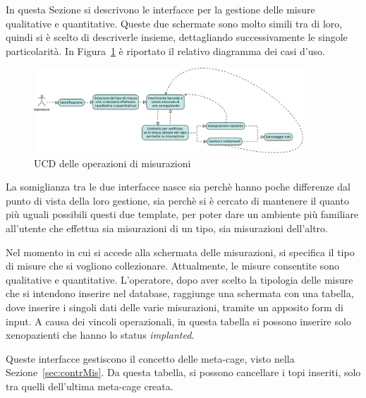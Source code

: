 In questa Sezione si descrivono le interfacce per la gestione delle misure qualitative e quantitative. Queste due schermate sono molto simili tra di loro, quindi si \`e scelto di descriverle insieme, dettagliando successivamente le singole particolarit\`a. In Figura~\ref{fig:UCDmeasure} \`e riportato il relativo diagramma dei casi d'uso.

\begin{figure}[h]
\begin{center}
\includegraphics[width=0.9\textwidth]{./Figure/UCDmeasurements}
\end{center}
\caption{UCD delle operazioni di misurazioni\label{fig:UCDmeasure}}
\end{figure}

La somiglianza tra le due interfacce nasce sia perch\`e hanno poche differenze dal punto di vista della loro gestione, sia perch\`e si \`e cercato di mantenere il quanto pi\`u uguali possibili questi due template, per poter dare un ambiente pi\`u familiare all'utente che effettua sia misurazioni di un tipo, sia misurazioni dell'altro.

Nel momento in cui si accede alla schermata delle misurazioni, si specifica il tipo di misure che si vogliono collezionare. Attualmente, le misure consentite sono qualitative e quantitative. L'operatore, dopo aver scelto la tipologia delle misure che si intendono inserire nel database, raggiunge una schermata con una tabella, dove inserire i singoli dati delle varie misurazioni, tramite un apposito form di input. A causa dei vincoli operazionali, in questa tabella si possono inserire solo xenopazienti che hanno lo status \textit{implanted}.

Queste interfacce gestiscono il concetto delle meta-cage, visto nella Sezione~\ref{sec:contrMis}. Da questa tabella, si possono cancellare i topi inseriti, solo tra quelli dell'ultima meta-cage creata.

